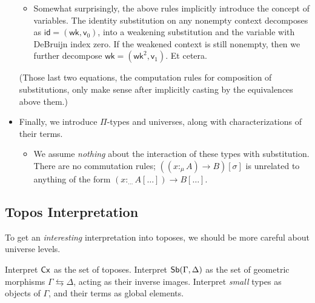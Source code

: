 \documentclass{article}
\begin{document}
\begin{itemize}
\begin{itemize}
        \item Somewhat surprisingly, the above rules implicitly introduce the concept of variables.
        The identity substitution on any nonempty context decomposes as \(\mathsf{id} = (\mathsf{wk},\mathsf{v}_0)\),
        into a weakening substitution and the variable with DeBruijn index zero.
        If the weakened context is still nonempty, then we further decompose \(\mathsf{wk} = (\mathsf{wk}^2,\mathsf{v}_1)\).
        Et cetera.
    \end{itemize}
    (Those last two equations, the computation rules for composition of substitutions,
    only make sense after implicitly casting by the equivalences above them.)
    \item Finally, we introduce \(\Pi\)-types and universes, along with characterizations of their terms.
    \begin{itemize}
        \item We assume \emph{nothing} about the interaction of these types with substitution.
        There are no commutation rules; \(((x :_\mu A) \to B)[\sigma]\) is unrelated to anything of the form \((x :_{\dots} A[\dots]) \to B[\dots]\).
    \end{itemize}
\end{itemize}

\subsection{Topos Interpretation}

To get an \emph{interesting} interpretation into toposes, we should be more careful about universe levels.

Interpret \(\mathsf{Cx}\) as the set of toposes. Interpret \(\mathsf{Sb}(\Gamma, \Delta)\)
as the set of geometric morphisms \(\Gamma \leftrightarrows \Delta\), acting as their inverse images.
Interpret \emph{small} types as objects of \(\Gamma\), and their terms as global elements.
\end{document}
